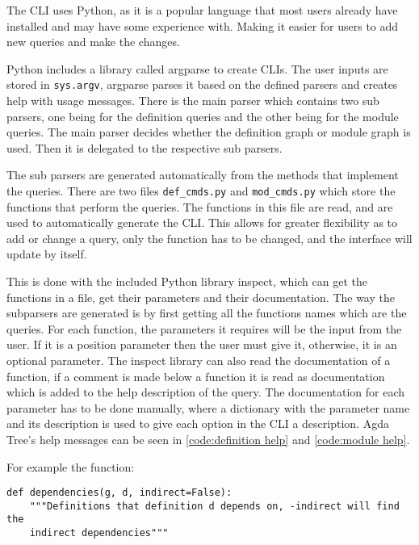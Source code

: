 The CLI uses Python, as it is a popular language that
most users already have installed and may have some experience with. Making it
easier for users to add new queries and make the changes. 

Python includes a library called argparse to create CLIs. The
user inputs are stored in \texttt{sys.argv}, argparse parses it based
on the defined parsers and creates help with usage messages. There is the main
parser which contains two sub parsers, one being for the definition queries and
the other being for the module queries. The main parser decides whether the
definition graph or module graph is used. Then it is delegated to the
respective sub parsers.


The sub parsers are generated automatically from the methods that implement the
queries. There are two files \texttt{def\_cmds.py} and \texttt{mod\_cmds.py} which store the functions
that perform the queries. The functions in this file are read, and are used to
automatically generate the CLI. This allows for greater flexibility as to add
or change a query, only the function has to be changed, and the interface will
update by itself.

This is done with the included Python library inspect, which can get the
functions in a file, get their parameters and their documentation. The way the
subparsers are generated is by first getting all the functions names which are
the queries. For each function, the parameters it requires will be the input
from the user. If it is a position parameter then the user must give it,
otherwise, it is an optional parameter. The inspect library can also read the
documentation of a function, if a comment is made below a function it is read
as documentation which is added to the help description of the query. The
documentation for each parameter has to be done manually, where a dictionary
with the parameter name and its description is used to give each option in the
CLI a description. Agda Tree's help messages can be seen in
\cref{code:definition help} and \cref{code:module help}.

For example the function:

\begin{lstlisting}
def dependencies(g, d, indirect=False):
    """Definitions that definition d depends on, -indirect will find the
    indirect dependencies"""
\end{lstlisting}

